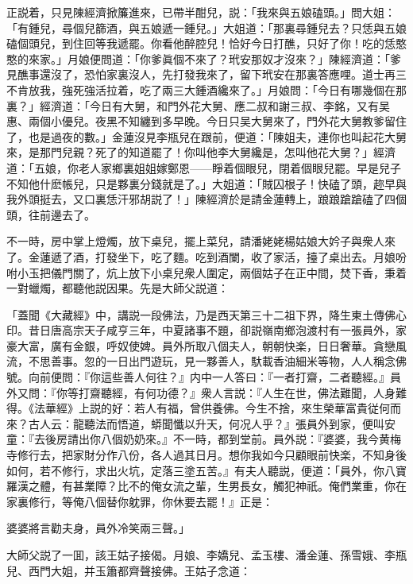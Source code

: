 正説着，只見陳經濟掀簾進來，已帶半酣兒，説：「我來與五娘磕頭。」問大姐：「有鍾兒，尋個兒篩酒，與五娘遞一鍾兒。」大姐道：「那裏尋鍾兒去？只恁與五娘磕個頭兒，到住回等我遞罷。你看他醉腔兒！恰好今日打醮，只好了你！吃的恁憨憨的來家。」月娘便問道：「你爹眞個不來了？玳安那奴才沒來？」陳經濟道：「爹見醮事還沒了，恐怕家裏沒人，先打發我來了，留下玳安在那裏答應哩。道士再三不肯放我，強死強活拉着，吃了兩三大鍾酒纔來了。」月娘問：「今日有哪幾個在那裏？」經濟道：「今日有大舅，和門外花大舅、應二叔和謝三叔、李銘，又有吴惠、兩個小優兒。夜黑不知纏到多早晚。今日只吴大舅來了，門外花大舅教爹留住了，也是過夜的數。」金蓮沒見李瓶兒在跟前，便道：「陳姐夫，連你也叫起花大舅來，是那門兒親？死了的知道罷了！你叫他李大舅纔是，怎叫他花大舅？」經濟道：「五娘，你老人家鄉裏姐姐嫁鄭恩——睜着個眼兒，閉着個眼兒罷。早是兒子不知他什麽帳兒，只是夥裏分錢就是了。」大姐道：「賊囚根子！快磕了頭，趂早與我外頭挺去，又口裏恁汗邪胡説了！」陳經濟於是請金蓮轉上，踉踉蹌蹌磕了四個頭，往前邊去了。

不一時，房中掌上燈燭，放下桌兒，擺上菜兒，請潘姥姥楊姑娘大妗子與衆人來了。金蓮遞了酒，打發坐下，吃了麵。吃到酒闌，收了家活，擡了桌出去。月娘吩咐小玉把儀門關了，炕上放下小桌兒衆人圍定，兩個姑子在正中間，焚下香，秉着一對蠟燭，都聽他説因果。先是大師父説道：

\begin{myquote}[\markfont]
「蓋聞《大藏經》中，講説一段佛法，乃是西天第三十二祖下界，降生東土傳佛心印。昔日唐高宗天子咸亨三年，中夏諸事不題，卻説嶺南鄉泡渡村有一張員外，家豪大富，廣有金銀，呼奴使婢。員外所取八個夫人，朝朝快楽，日日奢華。貪戀風流，不思善事。忽的一日出門遊玩，見一夥善人，馱載香油細米等物，人人稱念佛號。向前便問：『你這些善人何往？』内中一人答曰：『一者打齋，二者聽經。』員外又問：『你等打齋聽經，有何功德？』衆人言説：『人生在世，佛法難聞，人身難得。《法華經》上説的好：若人有福，曾供養佛。今生不捨，來生榮華富貴従何而來？古人云：龍聽法而悟道，蟒聞懺以升天，何况人乎？』張員外到家，便叫安童：『去後房請出你八個奶奶來。』不一時，都到堂前。員外説：『婆婆，我今黄梅寺修行去，把家財分作八份，各人過其日月。想你我如今只顧眼前快楽，不知身後如何，若不修行，求出火坑，定落三塗五苦。』有夫人聽説，便道：「員外，你八寶羅漢之體，有甚業障？比不的俺女流之輩，生男長女，觸犯神祇。俺們業重，你在家裏修行，等俺八個替你躭罪，你休要去罷！』正是：

婆婆將言勸夫身，員外冷笑兩三聲。」
\end{myquote}

大師父説了一囬，該王姑子接偈。月娘、李嬌兒、孟玉樓、潘金蓮、孫雪娥、李瓶兒、西門大姐，并玉簫都齊聲接佛。王姑子念道：

